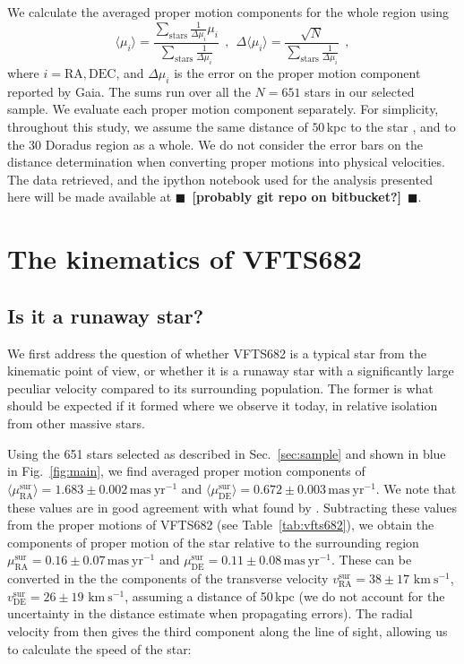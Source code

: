\documentclass{aa}
\newcommand{\todo}[1]{{\large $\blacksquare$~\textbf{\color{red}[#1]}}~$\blacksquare$}
\newcommand{\kms}{{\,\mathrm{km\ s^{-1}}}}
\DeclareRobustCommand{\Figref}[1]{Fig.~\ref{#1}}
\DeclareRobustCommand{\Tabref}[1]{Table~\ref{#1}}
\DeclareRobustCommand{\Secref}[1]{Sec.~\ref{#1}}
\begin{document}
We calculate the averaged proper motion components for the whole
region using 
\begin{equation}
  \label{eq:mean}
  \langle \mu_i\rangle = \frac{\sum_\mathrm{stars}\frac{1}{\Delta
      \mu_i}\mu_i}{\sum_\mathrm{stars} \frac{1}{\Delta \mu_i}} \ \ , \
  \ \Delta \langle \mu_i\rangle = \frac{\sqrt{N}}{\sum_\mathrm{stars}
    \frac{1}{\Delta \mu_i}} \ \ ,
\end{equation}
where $i = \mathrm{RA}, \mathrm{DEC}$, and $\Delta \mu_i$ is the error
on the proper motion component reported by Gaia. The sums run over
all the $N=651$ stars in our selected sample. We evaluate each proper motion
component separately. For simplicity, throughout this study, we assume the same
distance of $50$\,kpc to the star \citep[][]{lebouteiller:08}, and to
the 30 Doradus region as a whole. We do not consider the error bars on
the distance determination when converting proper motions into
physical velocities. The data retrieved, and the ipython notebook used for the analysis
presented here will be made available at \todo{probably git repo on bitbucket?}. 

\section{The kinematics of VFTS682}
\label{sec:results}

\subsection{Is it a runaway star?}
\label{sec:runaway}
We first address the question of whether VFTS682 is a typical star
from the kinematic point of view, or whether it is a runaway star with
a significantly large peculiar velocity compared to its surrounding population. The former is what should
be expected if it formed where we observe it today, in relative
isolation from other massive stars.

Using the 651 stars selected as described in \Secref{sec:sample} and shown in blue in \Figref{fig:main}, we find averaged proper motion components of
$\langle\mu_\mathrm{RA}^\mathrm{sur}\rangle = 1.683\pm0.002\,\mathrm{mas\ yr^{-1}}$ and
$\langle\mu_\mathrm{DE}^\mathrm{sur}\rangle =
0.672\pm0.003\,\mathrm{mas\ yr^{-1}}$. We note that these values are
in good agreement with what found by \cite{lennon:18}. Subtracting these values from the
proper motions of VFTS682 (see \Tabref{tab:vfts682}), we obtain the
components of proper motion of the star relative to the surrounding region
$\mu^\mathrm{sur}_\mathrm{RA} = 0.16\pm 0.07\,\mathrm{mas\ yr^{-1}}$ and $\mu^\mathrm{sur}_\mathrm{DE} =
0.11\pm 0.08\,\mathrm{mas\ yr^{-1}}$.
These can be converted in the
the components of the transverse velocity $v^\mathrm{sur}_\mathrm{RA}=38\pm17\,\kms$,
$v^\mathrm{sur}_\mathrm{DE}=26\pm19\,\kms$, assuming a distance of
50\,kpc (we do not account for the uncertainty in the distance
estimate when propagating errors). The radial velocity from
\cite{bestenlehner:11} then gives the third component along
the line of sight, allowing us to calculate the speed of the star:
\end{document}
